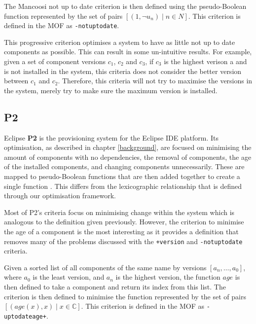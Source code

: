\begin{defs}
The Mancoosi not up to date criterion is then defined using the pseudo-Boolean function
represented by the set of pairs $[(1,\neg u_n) \mid n \in N]$.
This criterion is defined in the MOF as \verb+-notuptodate+.
\end{defs}


This progressive criterion optimises a system to have as little not up to date components as possible.
This can result in some un-intuitive results.
For example, given a set of component versions $c_1$, $c_2$ and $c_3$, if $c_3$ is the highest verison a and is not installed in the system, 
this criteria does not consider the better version between $c_1$ and $c_2$.
Therefore, this criteria will not try to maximise the versions in the system, merely try to make sure the maximum version is installed.


\subsection{P2}
Eclipse \textbf{P2} \citep{le_berre_dependency_2009,leBerre2010} is the provisioning system for the Eclipse IDE platform.
Its optimisation, as described in chapter \ref{background}, are focused on minimising the amount of components with no dependencies, the removal of components,
the age of the installed components, and changing components unnecessarily.
These are mapped to pseudo-Boolean functions that are then added together to create a single function \citep{leBerre2010}.
This differs from the lexicographic relationship that is defined through our optimisation framework.

Most of P2's criteria focus on minimising change within the system which is analogous to the definition given previously.
However, the criterion to minimise the age of a component is the most interesting as it provides a definition that removes many of the problems
discussed with the  \verb!+version! and \verb+-notuptodate+ criteria.

\begin{defs}
Given a sorted list of all components of the same name by versions $[a_n,\ldots,a_0]$, where $a_0$ is the least version, and $a_n$ is the highest version,
the function $age$ is then defined to take a component and return its index from this list.
The criterion is then defined to minimise the function represented by the set of pairs $[(age(x), x) \mid x \in \mathbb{C}]$.
This criterion is defined in the MOF as \verb!-uptodateage+!.
\end{defs}

